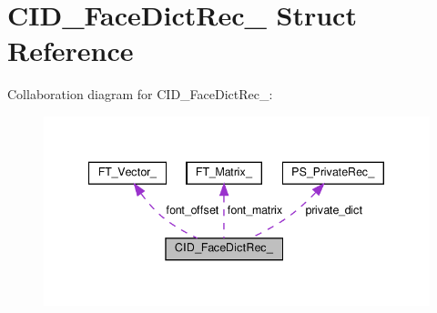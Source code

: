 \hypertarget{structCID__FaceDictRec__}{}\section{C\+I\+D\+\_\+\+Face\+Dict\+Rec\+\_\+ Struct Reference}
\label{structCID__FaceDictRec__}


Collaboration diagram for C\+I\+D\+\_\+\+Face\+Dict\+Rec\+\_\+\+:
\nopagebreak
\begin{figure}[H]
\begin{center}
\leavevmode
\includegraphics[width=340pt]{structCID__FaceDictRec____coll__graph}
\end{center}
\end{figure}
